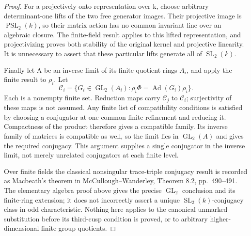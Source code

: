 \begin{proof}
For a projectively onto representation over k, choose arbitrary
determinant-one lifts of the two free generator images. Their
projective image is \(\operatorname{PSL}_2(k)\), so their
matrix action has no common invariant line over an algebraic
closure. The finite-field result applies to this lifted
representation, and projectivizing proves both stability of the
original kernel and projective linearity. It is unnecessary to
assert that these particular lifts generate all of
\(\operatorname{SL}_2(k)\).

Finally let A be an inverse limit of its finite quotient rings
\(A_i\), and apply the finite result to \(\rho_i\). Let
\[
 \mathcal C_i=\{G_i\in\operatorname{GL}_2(A_i):
        \rho_i\Phi=\operatorname{Ad}(G_i)\rho_i\}.
\]
Each is a nonempty finite set. Reduction maps carry
\(\mathcal C_j\) to \(\mathcal C_i\); surjectivity of
these maps is not assumed. Any finite list of compatibility
conditions is satisfied by choosing a conjugator at one common
finite refinement and reducing it. Compactness of the product
therefore gives a compatible family. Its inverse family of
matrices is compatible as well, so the limit lies in
\(\operatorname{GL}_2(A)\) and gives the required conjugacy.
This argument supplies a single conjugator in the inverse limit,
not merely unrelated conjugators at each finite level.

Over finite fields the classical nonsingular trace-triple
conjugacy result is recorded as Macbeath's theorem in
McCullough--Wanderley, Theorem 8.2, pp.~490--491.
\cite{CEMcCulloughWanderley2013}
The elementary algebra proof above gives the precise
\(\operatorname{GL}_2\) conclusion and its finite-ring
extension; it does not incorrectly assert a unique
\(\operatorname{SL}_2(k)\)-conjugacy class in odd characteristic.
Nothing here applies to the canonical unmarked substitution
before its third-cusp condition is proved, or to arbitrary
higher-dimensional finite-group quotients.
\end{proof}
